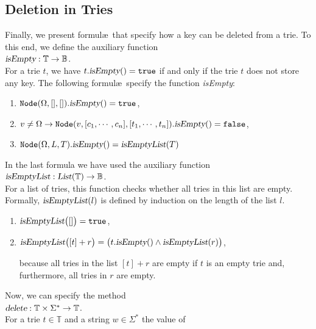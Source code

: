 \subsection{Deletion in Tries}
Finally, we present formul\ae\ that specify how a key can be deleted from a trie.
To this end, we define the auxiliary function
\\[0.2cm]
\hspace*{1.3cm} 
$\textsl{isEmpty}: \mathbb{T} \rightarrow \mathbb{B}$.
\\[0.2cm]
For a trie $t$, we have $t.\textsl{isEmpty}() = \mathtt{true}$ if and only if the trie $t$ does not
store any key.  The following formul\ae\ specify the function \textsl{isEmpty}:
\begin{enumerate}
\item $\texttt{Node}(\Omega, [],[]).\textsl{isEmpty}() = \mathtt{true}$,
\item $v \not= \Omega \rightarrow 
       \texttt{Node}(v, [c_1,\cdots,c_n],[t_1,\cdots,t_n]).\textsl{isEmpty}() = \mathtt{false}$,
\item $\texttt{Node}(\Omega, L, T).\textsl{isEmpty}() = \textsl{isEmptyList}(T)$
\end{enumerate}
In the last formula we have used the auxiliary function
\\[0.2cm]
\hspace*{1.3cm}
$\textsl{isEmptyList}: \textsl{List}(\mathbb{T}) \rightarrow \mathbb{B}$.
\\[0.2cm]
For a list of tries, this function checks whether all tries in this list are empty.  Formally,
$\textsl{isEmptyList}(l)$ is defined by induction on the length of the list $l$.
\begin{enumerate}
\item $\textsl{isEmptyList}\bigl([]\bigr) = \mathtt{true}$,
\item $\textsl{isEmptyList}\bigl([t] + r\bigr) = \bigl(t.\textsl{isEmpty}() \wedge \textsl{isEmptyList}(r)\bigr)$,

      because all  tries in the list $[t]+r$ are empty if  $t$ is an empty trie
      and, furthermore, all tries in  $r$ are empty.
\end{enumerate}
Now, we can specify the method
\\[0.2cm]
\hspace*{1.3cm}
$\textsl{delete}: \mathbb{T} \times \Sigma^* \rightarrow \mathbb{T}$.
\\[0.2cm]
For a trie  $t \in \mathbb{T}$ and a string $w \in \Sigma^*$ the value of
 \\[0.2cm]
